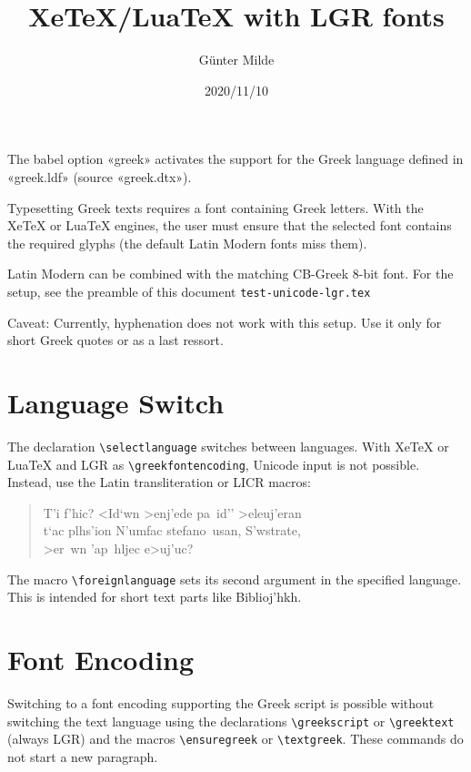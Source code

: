 \documentclass[a4paper]{article}
\begin{document}
\title{XeTeX/LuaTeX with LGR fonts}
\author{Günter Milde}
\date{2020/11/10}
\maketitle

The babel option «greek» activates the support for the Greek language
defined in «greek.ldf» (source «greek.dtx»).

Typesetting Greek texts requires a font containing Greek letters. With the
XeTeX or LuaTeX engines, the user must ensure that the selected font
contains the required glyphs (the default Latin Modern fonts miss them).

Latin Modern can be combined with the matching CB-Greek 8-bit font. For the
setup, see the preamble of this document \texttt{test-unicode-lgr.tex}

Caveat: Currently, hyphenation does not work with this setup. Use it only
for short Greek quotes or as a last ressort.

\section{Language Switch}

The declaration \verb|\selectlanguage| switches between languages. With
XeTeX or LuaTeX and LGR as \verb|\greekfontencoding|, Unicode input is not
possible. Instead, use the Latin transliteration or LICR macros:

\begin{quote}
  T'i f'hic? <Id`wn >enj'ede pa~id'' >eleuj'eran\\
  t`ac plhs'ion N'umfac stefano~usan, S'wstrate,\\
  >er~wn 'ap~hljec e>uj'uc?
\end{quote}

The macro \verb|\foreignlanguage| sets its second argument in the specified
language. This is intended for short text parts like
\foreignlanguage{greek}{Biblioj'hkh}.

\section{Font Encoding}

Switching to a font encoding supporting the Greek script is possible without
switching the text language using the declarations \verb|\greekscript| or
\verb|\greektext| (always LGR) and the macros \verb|\ensuregreek| or
\verb|\textgreek|. These commands do not start a new paragraph.
\end{document}
